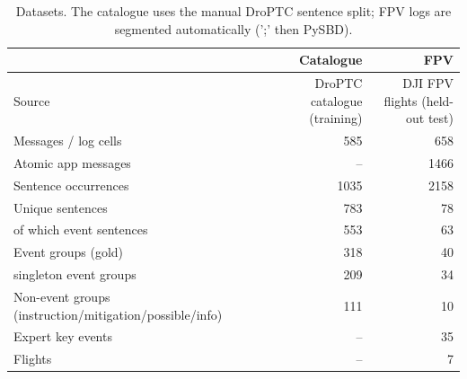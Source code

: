 \begin{table}[t]
\centering
\caption{Datasets. The catalogue uses the manual DroPTC sentence split; FPV logs are segmented automatically (';' then PySBD).}
\label{tab:dataset}
\small
\begin{tabular}{lrr}
\toprule
 & Catalogue & FPV \\
\midrule
Source & DroPTC catalogue (training) & DJI FPV flights (held-out test) \\
Messages / log cells & 585 & 658 \\
Atomic app messages & -- & 1466 \\
Sentence occurrences & 1035 & 2158 \\
Unique sentences & 783 & 78 \\
  of which event sentences & 553 & 63 \\
Event groups (gold) & 318 & 40 \\
  singleton event groups & 209 & 34 \\
Non-event groups (instruction/mitigation/possible/info) & 111 & 10 \\
Expert key events & -- & 35 \\
Flights & -- & 7 \\
\bottomrule
\end{tabular}
\end{table}